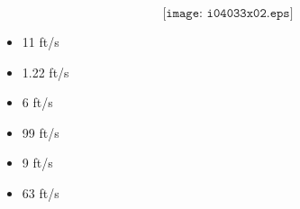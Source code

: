 $$\texttt{[image: i04033x02.eps]}$$

\begin{itemize}
\item{} 11 ft/s
\vskip 5pt 
\item{} 1.22 ft/s
\vskip 5pt 
\item{} 6 ft/s
\vskip 5pt 
\item{} 99 ft/s
\vskip 5pt 
\item{} 9 ft/s 
\vskip 5pt 
\item{} 63 ft/s
\end{itemize}





